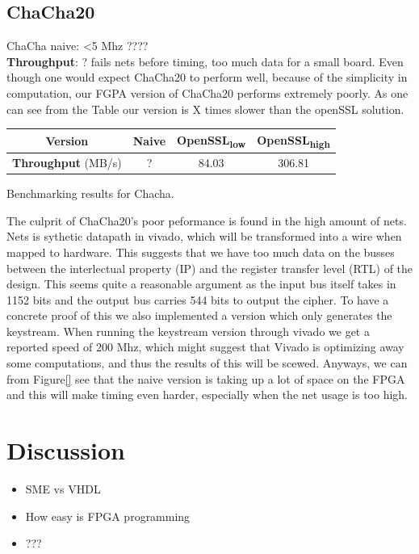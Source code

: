 \documentclass[a4paper]{article}
\begin{document}
\subsection{ChaCha20}
\label{sec:org6c33309}
ChaCha naive: <5 Mhz ????\\
\textbf{Throughput}: ?
fails nets before timing, too much data for a small board.
Even though one would expect ChaCha20 to perform well, because of the simplicity in computation, our FGPA version of ChaCha20 performs extremely poorly. As one can see from the Table our version is X times slower than the openSSL solution.
\begin{table}[htbp]
\centering
\begin{tabular}{|c|c|c|c|}
\hline
\textbf{Version} & Naive & OpenSSL\textsubscript{low} & OpenSSL\textsubscript{high}\\
\hline
\textbf{Throughput} (MB/s) & ? & 84.03 & 306.81\\
\hline
\end{tabular}
Benchmarking results for Chacha.

\end{table}
The culprit of ChaCha20's poor peformance is found in the high amount of nets. Nets is sythetic datapath in vivado, which will be transformed into a wire when mapped to hardware. This suggests that we have too much data on the busses between the interlectual property (IP) and the register transfer level (RTL) of the design. This seems quite a reasonable argument as the input bus itself takes in 1152 bits and the output bus carries 544 bits to output the cipher.
To have a concrete proof of this we also implemented a version which only generates the keystream. When running the keystream version through vivado we get a reported speed of 200 Mhz, which might suggest that Vivado is optimizing away some computations, and thus the results of this will be scewed. Anyways, we can from Figure\ref{} see that the naive version is taking up a lot of space on the FPGA and this will make timing even harder, especially when the net usage is too high.

\section{Discussion}
\label{sec:orgd0478b3}
\begin{itemize}
\item SME vs VHDL
\item How easy is FPGA programming
\item ???
\end{itemize}
\end{document}
